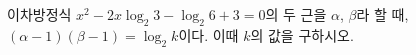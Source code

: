 이차방정식 $x^2-2x\log_2 3-\log_2 6+3=0$의 두 근을 $\alpha$, $\beta$라 할 때, $(\alpha-1)(\beta-1)=\log_2 k$이다. 이때 $k$의 값을 구하시오.
